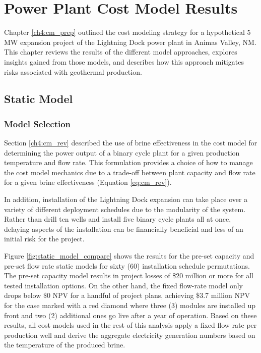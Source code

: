 \chapter{Power Plant Cost Model Results}\label{ch6:cm_results}

Chapter \ref{ch4:cm_prep} outlined the cost modeling strategy for a hypothetical 5 MW expansion project of the Lightning Dock power plant in Animas Valley, NM. This chapter reviews the results of the different model approaches, explores insights gained from those models, and describes how this approach mitigates risks associated with geothermal production.

\section{Static Model}
\label{ch6:static_mod}

\subsection{Model Selection}
\label{ch6:static_select}

Section \ref{ch4:cm_rev} described the use of brine effectiveness in the cost model for determining the power output of a binary cycle plant for a given production temperature and flow rate. This formulation provides a choice of how to manage the cost model mechanics due to a trade-off between plant capacity and flow rate for a given brine effectiveness (Equation \ref{eq:cm_rev}).

In addition, installation of the Lightning Dock expansion can take place over a variety of different deployment schedules due to the modularity of the system. Rather than drill ten wells and install five binary cycle plants all at once, delaying aspects of the installation can be financially beneficial and less of an initial risk for the project.

Figure \ref{fig:static_model_compare} shows the results for the pre-set capacity and pre-set flow rate static models for sixty (60) installation schedule permutations. The pre-set capacity model results in project losses of \$20 million or more for all tested installation options. On the other hand, the fixed flow-rate model only drops below \$0 NPV for a handful of project plans, achieving \$3.7 million NPV for the case marked with a red diamond where three (3) modules are installed up front and two (2) additional ones go live after a year of operation. Based on these results, all cost models used in the rest of this analysis apply a fixed flow rate per production well and derive the aggregate electricity generation numbers based on the temperature of the produced brine.

